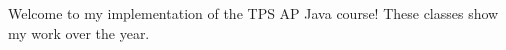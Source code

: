 Welcome to my implementation of the T\+PS AP Java course! These classes show my work over the year. 
